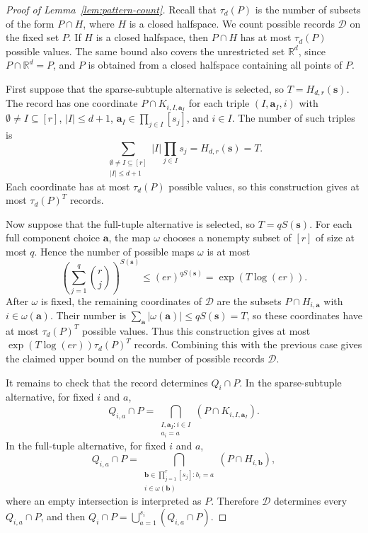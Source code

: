 \documentclass[11pt]{article}
\theoremstyle{definition}
\newcommand*{\abs}[1]{\lvert#1\rvert}
\newcommand{\R}{\mathbb{R}}
\begin{document}
\begin{proof}[Proof of Lemma~\ref{lem:pattern-count}]
Recall that \(\tau_{d}(P)\) is the number of subsets of the form \(P\cap H\), where \(H\) is a closed halfspace. We count possible records \(\mathcal{D}\) on the fixed set \(P\). If \(H\) is a closed halfspace, then \(P\cap H\) has at most \(\tau_{d}(P)\) possible values. The same bound also covers the unrestricted set \(\R^{d}\), since \(P\cap\R^{d}=P\), and \(P\) is obtained from a closed halfspace containing all points of \(P\).

First suppose that the sparse-subtuple alternative is selected, so \(T=H_{d,r}(\boldsymbol{s})\). The record has one coordinate \(P\cap K_{i,I,\boldsymbol{a}_{I}}\) for each triple \((I,\boldsymbol{a}_{I},i)\) with \(\emptyset\ne I\subseteq [r]\), \(\abs{I}\le d+1\), \(\boldsymbol{a}_{I}\in\prod_{j\in I}[s_{j}]\), and \(i\in I\). The number of such triples is
\[
\sum_{\substack{\emptyset\ne I\subseteq [r]\\ \abs{I}\le d+1}}\abs{I}\prod_{j\in I}s_{j}=H_{d,r}(\boldsymbol{s})=T.
\]
Each coordinate has at most \(\tau_{d}(P)\) possible values, so this construction gives at most \(\tau_{d}(P)^{T}\) records.

Now suppose that the full-tuple alternative is selected, so \(T=qS(\boldsymbol{s})\). For each full component choice \(\boldsymbol{a}\), the map \(\omega\) chooses a nonempty subset of \([r]\) of size at most \(q\). Hence the number of possible maps \(\omega\) is at most
\[
\left(\sum_{j=1}^{q}\binom{r}{j}\right)^{S(\boldsymbol{s})}\le (er)^{qS(\boldsymbol{s})}=\exp(T\log(er)).
\]
After \(\omega\) is fixed, the remaining coordinates of \(\mathcal{D}\) are the subsets \(P\cap H_{i,\boldsymbol{a}}\) with \(i\in\omega(\boldsymbol{a})\). Their number is \(\sum_{\boldsymbol{a}}\abs{\omega(\boldsymbol{a})}\le qS(\boldsymbol{s})=T\), so these coordinates have at most \(\tau_{d}(P)^{T}\) possible values. Thus this construction gives at most \(\exp(T\log(er))\tau_{d}(P)^{T}\) records. Combining this with the previous case gives the claimed upper bound on the number of possible records \(\mathcal{D}\).

It remains to check that the record determines \(Q_{i}\cap P\). In the sparse-subtuple alternative, for fixed \(i\) and \(a\),
\[
Q_{i,a}\cap P=\bigcap_{\substack{I,\boldsymbol{a}_{I}:i\in I\\ a_{i}=a}}\left(P\cap K_{i,I,\boldsymbol{a}_{I}}\right).
\]
In the full-tuple alternative, for fixed \(i\) and \(a\),
\[
Q_{i,a}\cap P=\bigcap_{\substack{\boldsymbol{b}\in\prod_{j=1}^{r}[s_{j}]:b_{i}=a\\ i\in\omega(\boldsymbol{b})}}\left(P\cap H_{i,\boldsymbol{b}}\right),
\]
where an empty intersection is interpreted as \(P\). Therefore \(\mathcal{D}\) determines every \(Q_{i,a}\cap P\), and then \(Q_{i}\cap P=\bigcup_{a=1}^{s_{i}}(Q_{i,a}\cap P)\).  
\end{proof}
\end{document}
